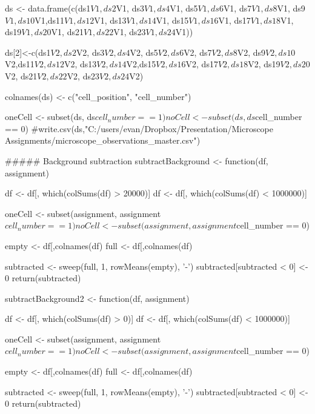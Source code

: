 \documentclass[10pt]{article}
\begin{document}
ds <- data.frame(c(ds1$V1, ds2$V1, ds3$V1, ds4$V1, ds5$V1, ds6$V1, 
                   ds7$V1, ds8$V1, ds9$V1,ds10$V1,ds11$V1,ds12$V1,
                   ds13$V1, ds14$V1, ds15$V1, ds16$V1, ds17$V1, ds18$V1,
                   ds19$V1, ds20$V1, ds21$V1, ds22$V1, ds23$V1, ds24$V1))

ds[2]<-c(ds1$V2, ds2$V2, ds3$V2, ds4$V2, ds5$V2, ds6$V2, 
         ds7$V2, ds8$V2, ds9$V2, ds10$V2,ds11$V2,ds12$V2,
         ds13$V2,ds14$V2,ds15$V2, ds16$V2, ds17$V2, ds18$V2,
         ds19$V2, ds20$V2, ds21$V2, ds22$V2, ds23$V2, ds24$V2)

colnames(ds) <- c("cell_position", "cell_number")

oneCell <- subset(ds, ds$cell_number == 1)
noCell <- subset(ds, ds$cell_number == 0)
#write.csv(ds,"C:/users/evan/Dropbox/Presentation/Microscope Assignments/microscope_observations_master.csv")

##### Background subtraction
subtractBackground <- function(df, assignment){
  df <- df[, which(colSums(df) > 20000)]
  df <- df[, which(colSums(df) < 1000000)]
  
  oneCell <- subset(assignment, assignment$cell_number == 1)
  noCell <- subset(assignment, assignment$cell_number == 0)
  
  empty <- df[,colnames(df)%
  full <- df[,colnames(df)%
  
  subtracted <- sweep(full, 1, rowMeans(empty), '-')
  subtracted[subtracted < 0] <- 0
  return(subtracted)
}

subtractBackground2 <- function(df, assignment){
  df <- df[, which(colSums(df) > 0)]
  df <- df[, which(colSums(df) < 1000000)]
  
  oneCell <- subset(assignment, assignment$cell_number == 1)
  noCell <- subset(assignment, assignment$cell_number == 0)
  
  empty <- df[,colnames(df)%
  full <- df[,colnames(df)%
  
  subtracted <- sweep(full, 1, rowMeans(empty), '-')
  subtracted[subtracted < 0] <- 0
  return(subtracted)
}
\end{document}
